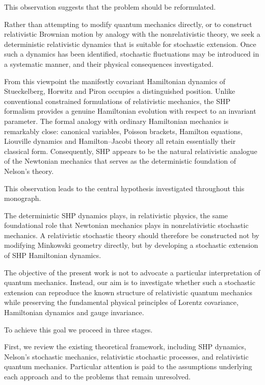 This observation suggests that the problem should be reformulated.

Rather than attempting to modify quantum mechanics directly, or to
construct relativistic Brownian motion by analogy with the
nonrelativistic theory, we seek a deterministic relativistic dynamics
that is suitable for stochastic extension. Once such a dynamics has been
identified, stochastic fluctuations may be introduced in a systematic
manner, and their physical consequences investigated.

From this viewpoint the manifestly covariant Hamiltonian dynamics of
Stueckelberg, Horwitz and Piron occupies a distinguished position.
Unlike conventional constrained formulations of relativistic mechanics,
the SHP formalism provides a genuine Hamiltonian evolution with respect
to an invariant parameter. The formal analogy with ordinary Hamiltonian
mechanics is remarkably close: canonical variables, Poisson brackets,
Hamilton equations, Liouville dynamics and Hamilton--Jacobi theory all
retain essentially their classical form. Consequently, SHP appears to be
the natural relativistic analogue of the Newtonian mechanics that serves
as the deterministic foundation of Nelson's theory.

This observation leads to the central hypothesis investigated throughout
this monograph.

The deterministic SHP dynamics plays, in relativistic physics, the same
foundational role that Newtonian mechanics plays in nonrelativistic
stochastic mechanics. A relativistic stochastic theory should therefore
be constructed not by modifying Minkowski geometry directly, but by
developing a stochastic extension of SHP Hamiltonian dynamics.

The objective of the present work is not to advocate a particular
interpretation of quantum mechanics. Instead, our aim is to investigate
whether such a stochastic extension can reproduce the known structure of
relativistic quantum mechanics while preserving the fundamental physical
principles of Lorentz covariance, Hamiltonian dynamics and gauge
invariance.

To achieve this goal we proceed in three stages.

First, we review the existing theoretical framework, including SHP
dynamics, Nelson's stochastic mechanics, relativistic stochastic
processes, and relativistic quantum mechanics. Particular attention is
paid to the assumptions underlying each approach and to the problems
that remain unresolved.

